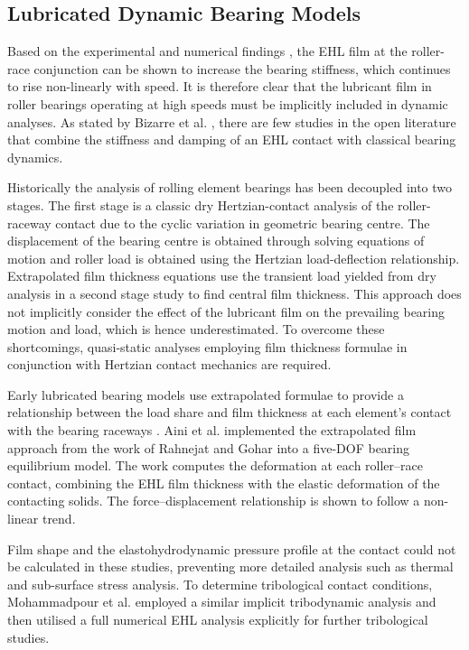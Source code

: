 \subsection{Lubricated Dynamic Bearing Models}

Based on the experimental and numerical findings \cite{Questa2020} \cite{Stone1982} \cite{Dietl1997}, the EHL film at the roller-race conjunction can be shown to increase the bearing stiffness, which continues to rise non-linearly with speed. It is therefore clear that the lubricant film in roller bearings operating at high speeds must be implicitly included in dynamic analyses. As stated by Bizarre et al. \cite{Bizarre2018}, there are few studies in the open literature that combine the stiffness and damping of an EHL contact with classical bearing dynamics.

Historically the analysis of rolling element bearings has been decoupled into two stages. The first stage is a classic dry Hertzian-contact analysis of the roller-raceway contact due to the cyclic variation in geometric bearing centre.  The displacement of the bearing centre is obtained through solving equations of motion and roller load is obtained using the Hertzian load-deflection relationship. Extrapolated film thickness equations use the transient load yielded from dry analysis in a second stage study to find central film thickness. This approach does not implicitly consider the effect of the lubricant film on the prevailing bearing motion and load, which is hence underestimated. To overcome these shortcomings, quasi-static analyses employing film thickness formulae in conjunction with Hertzian contact mechanics are required.

Early lubricated bearing models use extrapolated formulae to provide a relationship between the load share and film thickness at each element’s contact with the bearing raceways \cite{Rahnejat1985}. Aini et al. \cite{Aini2002} implemented the extrapolated film approach from the work of Rahnejat and Gohar \cite{Rahnejat1985} into a five-DOF bearing equilibrium model. The work computes the deformation at each roller–race contact, combining the EHL film thickness with the elastic deformation of the contacting solids. The force–displacement relationship is shown to follow a non-linear trend.

Film shape and the elastohydrodynamic pressure profile at the contact could not be calculated in these studies, preventing more detailed analysis such as thermal and sub-surface stress analysis. To determine tribological contact conditions, Mohammadpour et al. \cite{Mohammadpour2015c} employed a similar implicit tribodynamic analysis and then utilised a full numerical EHL analysis explicitly for further tribological studies.

